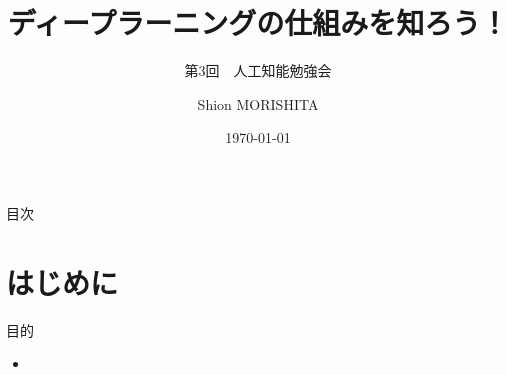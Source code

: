 \documentclass[dvipdfmx,aspectratio=169]{beamer}
\title{ディープラーニングの仕組みを知ろう！}
\subtitle{第3回　人工知能勉強会}
\author{Shion MORISHITA}
\institute{}
\date{\today}
\begin{document}
	\begin{frame}[plain]
	    \maketitle
	\end{frame}
		
	\begin{frame}[shrink]{目次}
		\vspace{1em}
		\tableofcontents
	\end{frame}
	
	\section{はじめに}
	\begin{frame}{目的}
		\begin{itemize}
			\item
		\end{itemize}
	\end{frame}
	
\end{document}
